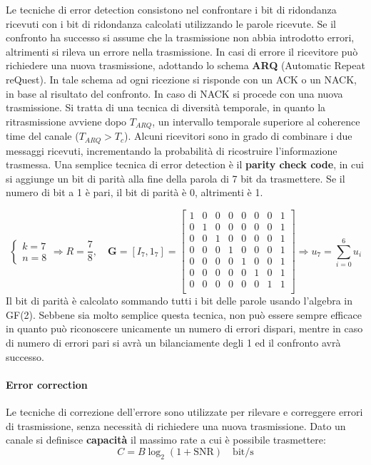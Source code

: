 Le tecniche di error detection consistono nel confrontare i bit di ridondanza ricevuti con i bit di ridondanza calcolati utilizzando le parole ricevute. 
Se il confronto ha successo si assume che la trasmissione non abbia introdotto errori, altrimenti si rileva un errore nella trasmissione.
In casi di errore il ricevitore può richiedere una nuova trasmissione, adottando lo schema \textbf{ARQ} (Automatic Repeat reQuest).
In tale schema ad ogni ricezione si risponde con un ACK o un NACK, in base al risultato del confronto.
In caso di NACK si procede con una nuova trasmissione. 
Si tratta di una tecnica di diversità temporale, in quanto la ritrasmissione avviene dopo $T_{ARQ}$, un intervallo temporale superiore al coherence time del canale ($T_{ARQ} > T_c$).
Alcuni ricevitori sono in grado di combinare i due messaggi ricevuti, incrementando la probabilità di ricostruire l'informazione trasmessa.
Una semplice tecnica di error detection è il \textbf{parity check code}, in cui si aggiunge un bit di parità alla fine della parola di 7 bit da trasmettere. Se il numero di bit a 1 è pari, il bit di parità è 0, altrimenti è 1.

\[
    \begin{cases}
        k = 7 \\
        n = 8 
    \end{cases}
    \Rightarrow R = \frac{7}{8},
    \quad \mathbf{G} = \left[I_7, 1_7\right] = 
    \begin{bmatrix}
        1 & 0 & 0 & 0 & 0 & 0 & 0 & 1 \\
        0 & 1 & 0 & 0 & 0 & 0 & 0 & 1 \\
        0 & 0 & 1 & 0 & 0 & 0 & 0 & 1 \\
        0 & 0 & 0 & 1 & 0 & 0 & 0 & 1 \\
        0 & 0 & 0 & 0 & 1 & 0 & 0 & 1 \\
        0 & 0 & 0 & 0 & 0 & 1 & 0 & 1 \\
        0 & 0 & 0 & 0 & 0 & 0 & 1 & 1 \\
    \end{bmatrix}
    \Rightarrow u_7 = \sum_{i=0}^{6} u_i
\]
Il bit di parità è calcolato sommando tutti i bit delle parole usando l'algebra in GF(2).
Sebbene sia molto semplice questa tecnica, non può essere sempre efficace in quanto può riconoscere unicamente un numero di errori dispari, mentre in caso di numero di errori pari si avrà un bilanciamente degli 1 ed il confronto avrà successo.

\paragraph*{Error correction}
Le tecniche di correzione dell'errore sono utilizzate per rilevare e correggere errori di trasmissione, senza necessità di richiedere una nuova trasmissione.
Dato un canale si definisce \textbf{capacità} il massimo rate a cui è possibile trasmettere:
\[
    C = B \log_2(1 + \text{SNR}) \quad \text{bit/s}
\]


